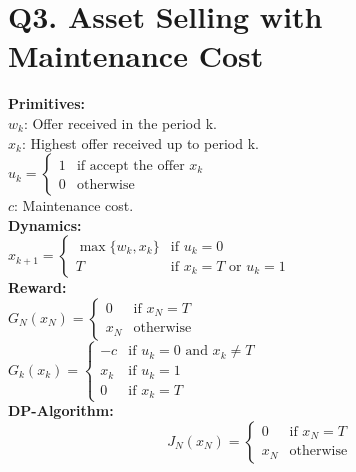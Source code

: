 \documentclass[11pt, english]{article}
\begin{document}
\section*{Q3. Asset Selling with Maintenance Cost}

\textbf{Primitives:}\\

$w_k$: Offer received in the period k.\\

$x_k$: Highest offer received up to period k.\\

$u_k=\left\{\begin{array}{ll}
1 & \text{if accept the offer }x_k\\
0 & \text{otherwise}
\end{array}\right.$\\

$c$: Maintenance cost.\\

\textbf{Dynamics:}\\

$x_{k + 1}=\left\{\begin{array}{ll}
\max\{w_k, x_k\} & \text{if } u_k = 0\\
T & \text{if } x_k = T \text{ or } u_k = 1
\end{array}\right.$\\

\textbf{Reward:}\\

$G_N(x_N) = \left\{\begin{array}{ll}
0 & \text{if } x_N = T\\
x_N & \text{otherwise}
\end{array}\right.$\\

$G_k(x_k)=\left\{\begin{array}{ll}
-c & \text{if } u_k = 0 \text{ and } x_k  \neq T\\
x_k & \text{if } u_k = 1 \\
0 & \text{if } x_k = T
\end{array}\right.$\\

\textbf{DP-Algorithm:}\\

\begin{equation*}
J_N(x_N) = \left\{\begin{array}{ll}
0 & \text{if } x_N = T\\
x_N & \text{otherwise}
\end{array}\right.
\end{equation*}
\end{document}
